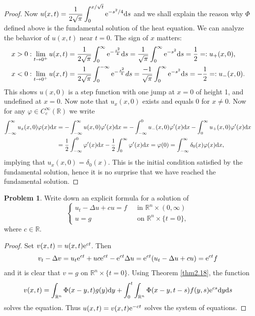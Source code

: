 \documentclass[hyperref,UTF8,12pt]{article}
\numberwithin{equation}{subsection}
\theoremstyle{plain}
\theoremstyle{definition}
\newtheorem{problem}{Problem}
\numberwithin{theorem}{section}
\numberwithin{lemma}{section}
\numberwithin{proposition}{section}
\numberwithin{remark}{section}
\numberwithin{corollary}{section}
\numberwithin{definition}{section}
\numberwithin{problem}{section}
\numberwithin{example}{section}
\def\e{\textup{e}}
\def\dif{\textup{d}}
\newcommand{\dis}{\displaystyle}
\newcommand{\mr}{\mathbb{R}}
\begin{document}
\begin{proof}
Now $u(x,t)=\dis\frac{1}{2\sqrt{\pi}}\int_0^{x/\sqrt{t}}\e^{-s^2/4}\dif s$ and we shall explain the reason why $\Phi$ defined above is the fundamental solution of the heat equation. We can analyze the behavior of $u(x,t)$ near $t=0$. The sign of $x$ matters:
\[\begin{aligned}
	&x>0:\lim_{t\to0^+}u(x,t)=\frac{1}{2\sqrt{\pi}}\int_0^\infty\e^{-\frac{s^2}{4}}\dif s=\frac{1}{\sqrt{\pi}}\int_0^\infty\e^{-s^2}\dif s=\frac{1}{2}=:u_+(x, 0), \\
	&x<0:\lim_{t\to0^+}u(x,t)=\frac{1}{2\sqrt{\pi}}\int_0^{-\infty}\e^{-\frac{s^2}{4}} d s=\frac{-1}{\sqrt{\pi}}\int_0^\infty\e^{-s^2}\dif s=-\frac{1}{2}=:u_-(x,0).
\end{aligned}\]
This shows $u(x, 0)$ is a step function with one jump at $x=0$ of height 1, and undefined at $x=0$. Now note that $u_x(x,0)$ exists and equals 0 for $x\neq0$. Now for any $\varphi\in C_c^\infty(\mr)$ we write\[\begin{aligned}
	\int_{-\infty}^{\infty}u_x(x,0)\varphi(x)\dif x&=-\int_{-\infty}^{\infty}u(x, 0) \varphi^\prime(x)\dif x=-\int_{-\infty}^0u_-(x,0)\varphi^\prime(x)\dif x-\int_0^{\infty}u_+(x, 0)\varphi^\prime(x)\dif x\\
	&=\frac{1}{2}\int_{-\infty}^0\varphi^\prime(x)\dif x-\frac{1}{2}\int_0^\infty \varphi^\prime(x)\dif x=\varphi(0)=\int_{-\infty}^\infty\delta_0(x)\varphi(x)\dif x,
\end{aligned}\]implying that $u_x(x,0)=\delta_0(x)$. This is the initial condition satisfied by the fundamental solution, hence it is no surprise that we have reached the fundamental solution.
\end{proof}
\begin{problem}
Write down an explicit formula for a solution of
\[\left\{\begin{array}{rlrl}
	u_t-\Delta u+cu=f&\text{~~in }\mr^n\times(0,\infty)\\
	u=g&\text{~~on }\mr^n\times\{t=0\},
\end{array}\right.\]
where $c\in\mr$.
\end{problem}
\begin{proof}
Set $v(x,t)=u(x,t)\e^{ct}$. Then \[v_t-\Delta v=u_t\e^{ct}+uc\e^{ct}-\e^{ct}\Delta u=\e^{ct}(u_t-\Delta u+cu)=\e^{ct}f\]and it is clear that $v=g$ on $\mr^n\times\{t=0\}$. Using Theorem \ref{thm2.18}, the function \[v(x,t)=\int_{\mr^n}\Phi(x-y,t)g(y)\dif y+\int_0^t\int_{\mr^n}\Phi(x-y,t-s)f(y,s) \e^{cs}\dif y\dif s\] solves the equation. Thus $u(x,t)=v(x,t)\e^{-ct}$ solves the system of equations.
\end{proof}
\end{document}
